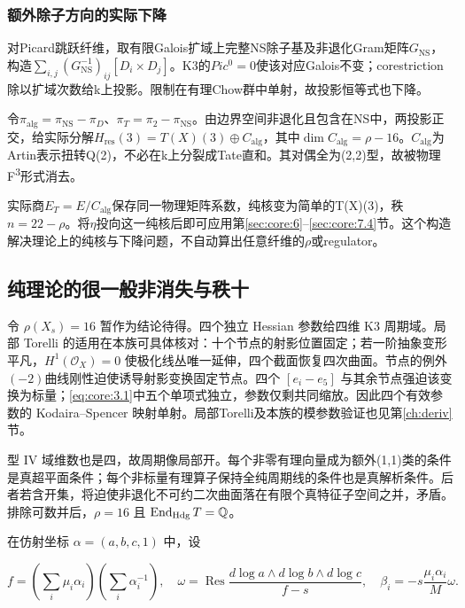 \documentclass[11pt,a4paper,oneside]{ctexart}
\theoremstyle{cnplain}
\theoremstyle{definition}
\theoremstyle{remark}
\numberwithin{equation}{section}
\begin{document}
\subsubsection{额外除子方向的实际下降}\label{sec:core:7.5}

对Picard跳跃纤维，取有限Galois扩域上完整NS除子基及非退化Gram矩阵\(G_{\mathrm{NS}}\)，构造\(\sum_{i,j}(G_{\mathrm{NS}}^{-1})_{ij}[D_i\times D_j]\)。K3的\(Pic^{0}=0\)使该对应Galois不变；corestriction除以扩域次数给k上投影。限制在有理Chow群中单射，故投影恒等式也下降。

令\(\pi _{\mathrm{alg}}=\pi _{\mathrm{NS}}- \pi _D\)、\(\pi _T=\pi _{2}- \pi _{\mathrm{NS}}\)。由边界空间非退化且包含在NS中，两投影正交，给实际分解\(H_{\mathrm{res}}(3)=T(X)(3)\oplus C_{\mathrm{alg}}\)，其中\(\dim C_{\mathrm{alg}}=\rho - 16\)。\(C_{\mathrm{alg}}\)为Artin表示扭转Q(2)，不必在k上分裂成Tate直和。其对偶全为(2,2)型，故被物理F\textsuperscript{3}形式消去。

实际商\(E_T=E/C_{\mathrm{alg}}\)保存同一物理矩阵系数，纯核变为简单的T(X)(3)，秩\(n=22- \rho \)。将\(\eta \)投向这一纯核后即可应用第\ref{sec:core:6}--\ref{sec:core:7.4}节。这个构造解决理论上的纯核与下降问题，不自动算出任意纤维的\(\rho \)或regulator。


\subsection{纯理论的很一般非消失与秩十}\label{sec:core:8}

令 \(\rho(X_s)=16\) 暂作为结论待得。四个独立 Hessian 参数给四维 K3 周期域。局部 Torelli 的适用在本族可具体核对：十个节点的射影位置固定；若一阶抽象变形平凡，\(H^1(\mathcal O_X)=0\) 使极化线丛唯一延伸，四个截面恢复四次曲面。节点的例外\((- 2)\)曲线刚性迫使诱导射影变换固定节点。四个 \([e_i-e_5]\) 与其余节点强迫该变换为标量；\eqref{eq:core:3.1}中五个单项式独立，参数仅剩共同缩放。因此四个有效参数的 Kodaira--Spencer 映射单射。局部Torelli及本族的模参数验证也见第\ref{ch:deriv}节。

型 IV 域维数也是四，故周期像局部开。每个非零有理向量成为额外(1,1)类的条件是真超平面条件；每个非标量有理算子保持全纯周期线的条件也是真解析条件。后者若含开集，将迫使非退化不可约二次曲面落在有限个真特征子空间之并，矛盾。排除可数并后，\(\rho=16\) 且 \(\operatorname{End}_{\rm Hdg}T=\mathbb Q\)。

在仿射坐标 \(\alpha=(a,b,c,1)\) 中，设

\begin{equation}
f=(\textstyle\sum_i\mu_i\alpha_i)(\sum_i\alpha_i^{-1}),
 \quad\omega=\operatorname{Res}\frac{d\log a\wedge d\log b\wedge d\log c}{f-s},
 \quad\beta_i=-s\frac{\mu_i\alpha_i}{M}\omega.
\end{equation}
\end{document}
